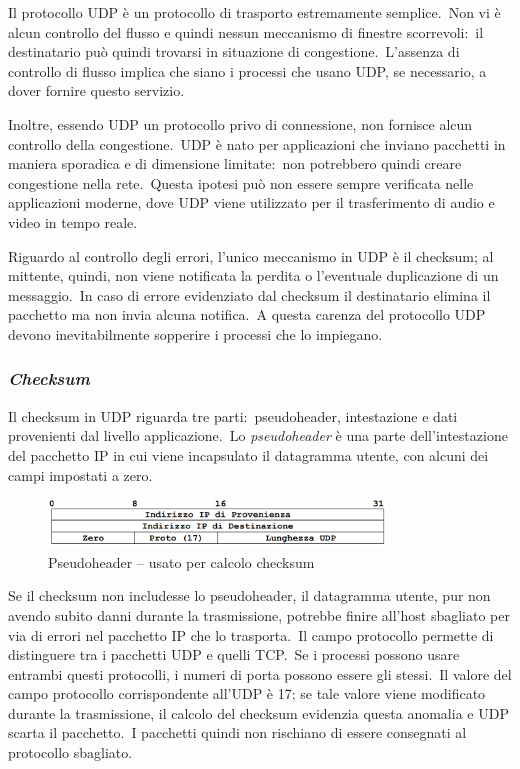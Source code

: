 Il protocollo UDP è un protocollo di trasporto estremamente semplice.\
Non vi è alcun controllo del flusso e quindi nessun meccanismo di finestre scorrevoli:\ il destinatario può quindi trovarsi in situazione di congestione.\
L'assenza di controllo di flusso implica che siano i processi che usano UDP, se necessario, a dover fornire questo servizio.

Inoltre, essendo UDP un protocollo privo di connessione, non fornisce alcun controllo della congestione.\
UDP è nato per applicazioni che inviano pacchetti in maniera sporadica e di dimensione limitate:\ non potrebbero quindi creare congestione nella rete.\
Questa ipotesi può non essere sempre verificata nelle applicazioni moderne, dove UDP viene utilizzato per il trasferimento di audio e video in tempo reale.

Riguardo al controllo degli errori, l'unico meccanismo in UDP è il checksum; al mittente, quindi, non viene notificata la perdita o l'eventuale duplicazione di un messaggio.\
In caso di errore evidenziato dal checksum il destinatario elimina il pacchetto ma non invia alcuna notifica.\
A questa carenza del protocollo UDP devono inevitabilmente sopperire i processi che lo impiegano.

\subsubsection{\emph{Checksum}}

Il checksum in UDP riguarda tre parti:\ pseudoheader, intestazione e dati provenienti dal livello applicazione.\
Lo \emph{pseudoheader} è una parte dell'intestazione del pacchetto IP in cui viene incapsulato il datagramma utente, con alcuni dei campi impostati a zero.

\begin{figure}[H]
    \centering
    \includegraphics[width=0.8\textwidth]{immagini/Pseudoheader.png}
    \caption*{Pseudoheader – usato per calcolo checksum}
\end{figure}

Se il checksum non includesse lo pseudoheader, il datagramma utente, pur non avendo subito danni durante la trasmissione, potrebbe finire all'host sbagliato per via di errori nel pacchetto IP che lo trasporta.\
Il campo protocollo permette di distinguere tra i pacchetti UDP e quelli TCP.\
Se i processi possono usare entrambi questi protocolli, i numeri di porta possono essere gli stessi.\
Il valore del campo protocollo corrispondente all'UDP è 17; se tale valore viene modificato durante la trasmissione, il calcolo del checksum evidenzia questa anomalia e UDP scarta il pacchetto.\
I pacchetti quindi non rischiano di essere consegnati al protocollo sbagliato.

